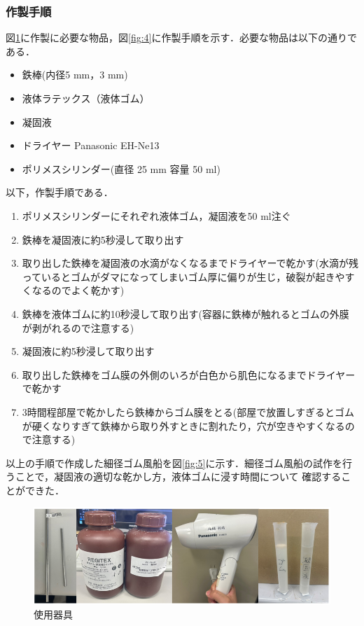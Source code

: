 \subsubsection{作製手順}
図\ref{fig:3}に作製に必要な物品，図\ref{fig:4}に作製手順を示す．必要な物品は以下の通りである．
\begin{itemize}
    \item 鉄棒(内径5 mm，3 mm)
    \item 液体ラテックス（液体ゴム）
    \item 凝固液
    \item ドライヤー Panasonic EH-Ne13
    \item ポリメスシリンダー(直径 25 mm 容量 50 ml)
  \end{itemize}
  以下，作製手順である．
\begin{enumerate}
    \item ポリメスシリンダーにそれぞれ液体ゴム，凝固液を50 ml注ぐ　
    \item 鉄棒を凝固液に約5秒浸して取り出す
    \item 取り出した鉄棒を凝固液の水滴がなくなるまでドライヤーで乾かす(水滴が残っているとゴムがダマになってしまいゴム厚に偏りが生じ，破裂が起きやすくなるのでよく乾かす)
    \item 鉄棒を液体ゴムに約10秒浸して取り出す(容器に鉄棒が触れるとゴムの外膜が剥がれるので注意する)
    \item 凝固液に約5秒浸して取り出す
    \item 取り出した鉄棒をゴム膜の外側のいろが白色から肌色になるまでドライヤーで乾かす
    \item 3時間程部屋で乾かしたら鉄棒からゴム膜をとる(部屋で放置しすぎるとゴムが硬くなりすぎて鉄棒から取り外すときに割れたり，穴が空きやすくなるので注意する)
\end{enumerate}
以上の手順で作成した細径ゴム風船を図\ref{fig:5}に示す．細径ゴム風船の試作を行うことで，凝固液の適切な乾かし方，液体ゴムに浸す時間について
確認することができた．
\begin{figure}[!h]
  \centering  %
  \includegraphics[scale=0.5]{pic/kigu.PNG}
  \caption{使用器具}
  \label{fig:3}
\end{figure}
